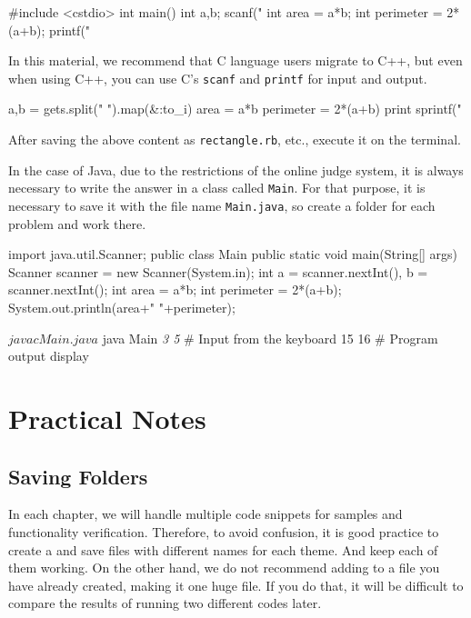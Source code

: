 \begin{cbox}
#include <cstdio>
int main() {
  int a,b;
  scanf("%
  int area = a*b;
  int perimeter = 2*(a+b);
  printf("%
}
\end{cbox}
In this material, we recommend that C language users migrate to C++, but even when using C++, you can use C's \texttt{scanf} and \texttt{printf} for input and output.

\begin{rbox}
a,b = gets.split(" ").map(&:to_i)
area = a*b
perimeter = 2*(a+b)
print sprintf("%
\end{rbox}

After saving the above content as \texttt{rectangle.rb}, etc., execute it on the terminal.

In the case of Java, due to the restrictions of the online judge system, it is always necessary to write the answer in a class called \texttt{Main}. For that purpose, it is necessary to save it with the file name \texttt{Main.java}, so create a folder for each problem and work there.
\begin{javabox}[emph={Main}]
import java.util.Scanner;
public class Main {
    public static void main(String[] args) {
	Scanner scanner = new Scanner(System.in);
	int a = scanner.nextInt(), b = scanner.nextInt();
	int area = a*b;
	int perimeter = 2*(a+b);
	System.out.println(area+" "+perimeter);
    }
}
\end{javabox}

\begin{terminal}
$ javac Main.java
$ java Main
\textit{3 5} # Input from the keyboard
15 16 # Program output display
\end{terminal}
\section{Practical Notes}\label{section:commands}
\subsection{Saving Folders}
In each chapter, we will handle multiple code snippets for samples and functionality verification.
Therefore, to avoid confusion, it is good practice to create a  and save files with different names for each theme. And keep each of them working.
On the other hand, we do not recommend adding to a file you have already created, making it one huge file. If you do that, it will be difficult to compare the results of running two different codes later.


